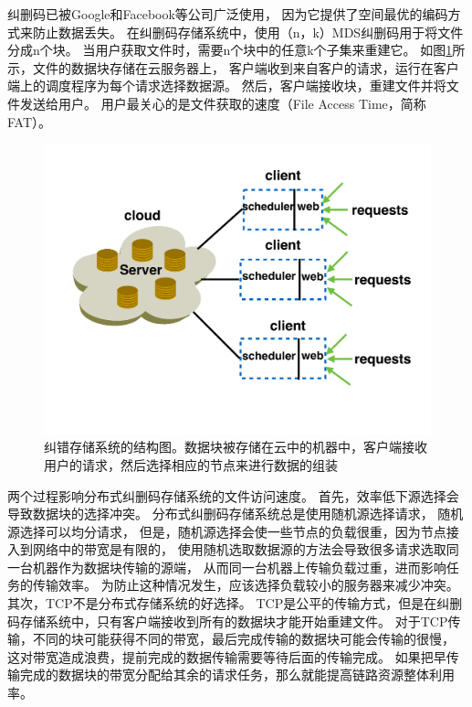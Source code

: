 纠删码已被Google和Facebook等公司广泛使用\cite{sathiamoorthy2013xoring,wu2010cloud}，
因为它提供了空间最优的编码方式来防止数据丢失。
在纠删码存储系统中，使用（n，k）MDS纠删码用于将文件分成n个块。
当用户获取文件时，需要n个块中的任意k个子集来重建它。
如图\ref{erasure-distribute-fig}所示，文件的数据块存储在云服务器上，
客户端收到来自客户的请求，运行在客户端上的调度程序为每个请求选择数据源。
然后，客户端接收块，重建文件并将文件发送给用户。
用户最关心的是文件获取的速度（File Access Time，简称FAT）。
\begin{figure}[b]
\begin{center}
\includegraphics [width=0.8\columnwidth] {figures/DTARGET/picture/motivation/distribute.pdf}
\caption{纠错存储系统的结构图。数据块被存储在云中的机器中，客户端接收用户的请求，然后选择相应的节点来进行数据的组装}
\label{erasure-distribute-fig}
\end{center}
\end{figure}

两个过程影响分布式纠删码存储系统的文件访问速度。
首先，效率低下源选择会导致数据块的选择冲突。
分布式纠删码存储系统总是使用随机源选择请求，
随机源选择可以均分请求，
但是，随机源选择会使一些节点的负载很重，因为节点接入到网络中的带宽是有限的，
使用随机选取数据源的方法会导致很多请求选取同一台机器作为数据块传输的源端，
从而同一台机器上传输负载过重，进而影响任务的传输效率。
为防止这种情况发生，应该选择负载较小的服务器来减少冲突。
其次，TCP不是分布式存储系统的好选择。
TCP是公平的传输方式，但是在纠删码存储系统中，只有客户端接收到所有的数据块才能开始重建文件。
对于TCP传输，不同的块可能获得不同的带宽，最后完成传输的数据块可能会传输的很慢，
这对带宽造成浪费，提前完成的数据传输需要等待后面的传输完成。
如果把早传输完成的数据块的带宽分配给其余的请求任务，那么就能提高链路资源整体利用率。

